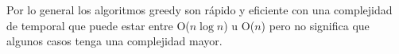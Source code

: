 Por lo general los algoritmos greedy son rápido y eficiente con una complejidad de temporal que puede estar entre  O($n\log n$) u O($n$) pero no significa que algunos casos tenga una complejidad mayor. 